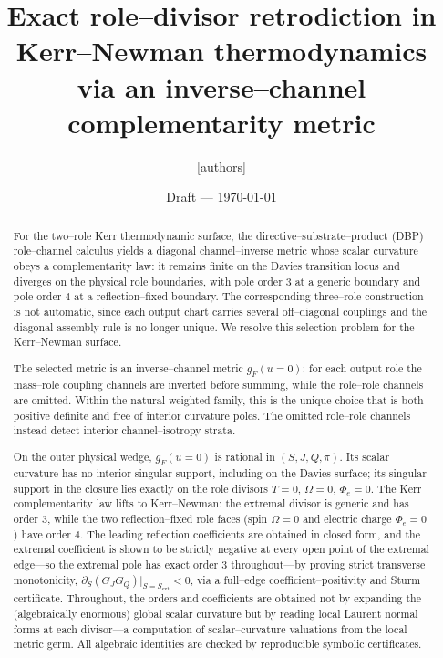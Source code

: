 \documentclass[11pt]{article}
\title{Exact role--divisor retrodiction in Kerr--Newman thermodynamics\\
via an inverse--channel complementarity metric}
\author{[authors]}
\date{Draft --- \today}
\newcommand{\Sext}{S_{\mathrm{ext}}}
\begin{document}
\maketitle

\begin{abstract}
For the two--role Kerr thermodynamic surface, the directive--substrate--product (DBP)
role--channel calculus yields a diagonal channel--inverse metric whose scalar curvature obeys
a complementarity law: it remains finite on the Davies transition locus and diverges on the
physical role boundaries, with pole order $3$ at a generic boundary and pole order $4$ at a
reflection--fixed boundary. The corresponding three--role construction is not automatic, since
each output chart carries several off--diagonal couplings and the diagonal assembly rule is no
longer unique. We resolve this selection problem for the Kerr--Newman surface.

The selected metric is an inverse--channel metric $g_F(u{=}0)$: for each output role the
mass--role coupling channels are inverted before summing, while the role--role channels are
omitted. Within the natural weighted family, this is the unique choice that is both positive
definite and free of interior curvature poles. The omitted role--role channels instead detect
interior channel--isotropy strata.

On the outer physical wedge, $g_F(u{=}0)$ is rational in $(S,J,Q,\pi)$. Its scalar curvature
has no interior singular support, including on the Davies surface; its singular support in the
closure lies exactly on the role divisors $T=0$, $\Omega=0$, $\Phi_e=0$. The Kerr
complementarity law lifts to Kerr--Newman: the extremal divisor is generic and has order $3$,
while the two reflection--fixed role faces (spin $\Omega=0$ and electric charge $\Phi_e=0$)
have order $4$. The leading reflection coefficients are obtained in closed form, and the
extremal coefficient is shown to be strictly negative at every open point of the extremal
edge---so the extremal pole has exact order $3$ throughout---by proving strict transverse
monotonicity, $\partial_S(G_JG_Q)\big|_{S=\Sext}<0$, via a full--edge coefficient--positivity
and Sturm certificate. Throughout, the orders and coefficients are obtained not by expanding the
(algebraically enormous) global scalar curvature but by reading local Laurent normal forms at
each divisor---a computation of scalar--curvature valuations from the local metric germ. All
algebraic identities are checked by reproducible symbolic certificates.
\end{abstract}
\end{document}
